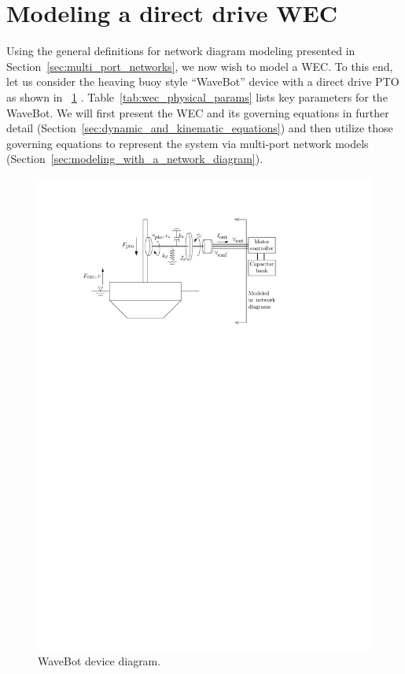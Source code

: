 \documentclass[twocolumn]{autart}
\begin{document}
\section{Modeling a direct drive WEC}\label{sec:modeling_a_direct_drive_wec}
Using the general definitions for network diagram modeling presented in Section~\ref{sec:multi_port_networks}, we now wish to model a WEC.
To this end, let us consider the heaving buoy style ``WaveBot'' device with a direct drive PTO as shown in \figurename~\ref{fig:wec_as_multiport_physical_diagram} \cite{Forbush:2024aa}.
Table~\ref{tab:wec_physical_params} lists key parameters for the WaveBot.
We will first present the WEC and its governing equations in further detail (Section~\ref{sec:dynamic_and_kinematic_equations}) and then utilize those governing equations to represent the system via multi-port network models (Section~\ref{sec:modeling_with_a_network_diagram}).

\begin{figure}[tb]
        \centering
        \includegraphics[width=1\columnwidth]{wec_as_multiport_phyiscal_diagram.pdf}
        \caption{WaveBot device diagram.}
        \label{fig:wec_as_multiport_physical_diagram}
\end{figure}
\end{document}
